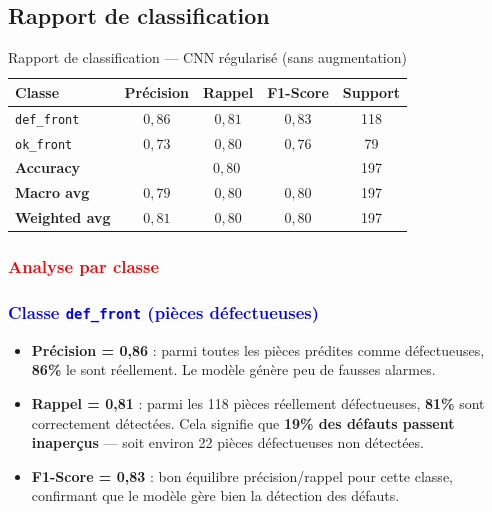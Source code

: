 \subsection{Rapport de classification}

\begin{table}[H]
\centering
\caption{Rapport de classification — CNN régularisé (sans augmentation)}
\label{tab:report_reg}
\renewcommand{\arraystretch}{1.3}
\begin{tabular}{|l|c|c|c|c|}
\hline
\textbf{Classe} & \textbf{Précision} & \textbf{Rappel} & \textbf{F1-Score} & \textbf{Support} \\
\hline
\texttt{def\_front}      & $0{,}86$ & $0{,}81$ & $0{,}83$ & 118 \\
\hline
\texttt{ok\_front}       & $0{,}73$ & $0{,}80$ & $0{,}76$ & 79  \\
\hline\hline
\textbf{Accuracy}        & \multicolumn{3}{c|}{$0{,}80$} & 197 \\
\hline
\textbf{Macro avg}       & $0{,}79$ & $0{,}80$ & $0{,}80$ & 197 \\
\hline
\textbf{Weighted avg}    & $0{,}81$ & $0{,}80$ & $0{,}80$ & 197 \\
\hline
\end{tabular}
\end{table}






\textcolor{red}{\subsubsection*{Analyse par classe}}

\textcolor{blue}{\subsubsection*{Classe \texttt{def\_front} (pièces défectueuses)}}

\begin{itemize}
    \item \textbf{Précision = 0,86} : parmi toutes les pièces prédites comme 
    défectueuses, \textbf{86\%} le sont réellement. Le modèle génère peu de 
    fausses alarmes.
    
    \item \textbf{Rappel = 0,81} : parmi les 118 pièces réellement défectueuses, 
    \textbf{81\%} sont correctement détectées. Cela signifie que \textbf{19\% 
    des défauts passent inaperçus} — soit environ 22 pièces défectueuses 
    non détectées.
    
    \item \textbf{F1-Score = 0,83} : bon équilibre précision/rappel pour cette 
    classe, confirmant que le modèle gère bien la détection des défauts.
\end{itemize}

